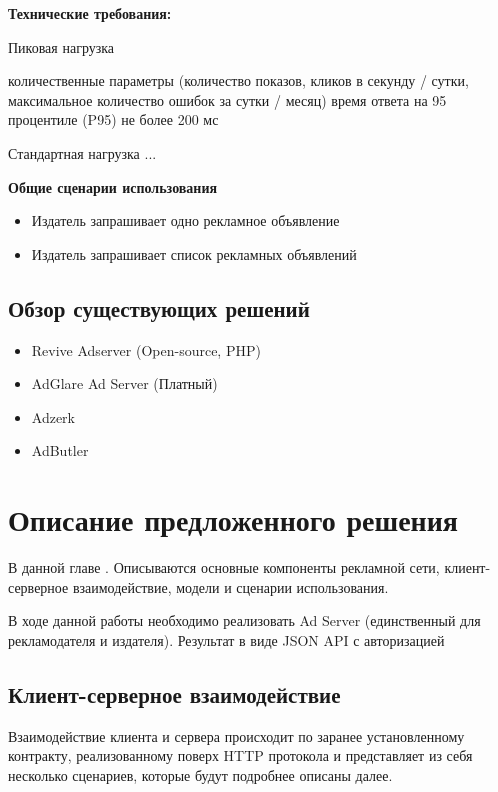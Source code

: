 \documentclass[times]{itmo-student-thesis}
\begin{document}
\textbf{Технические требования:} 

Пиковая нагрузка

количественные параметры (количество показов, кликов в секунду / сутки, максимальное количество ошибок за сутки / месяц)
время ответа на 95 процентиле (P95) не более 200 мс

Стандартная нагрузка ...

\textbf{Общие сценарии использования}
\begin{itemize}
	\item Издатель запрашивает одно рекламное объявление
	\item Издатель запрашивает список рекламных объявлений
\end{itemize}

\section{Обзор существующих решений}

\begin{itemize}
\item Revive Adserver (Open-source, PHP)
\item AdGlare Ad Server (Платный)
\item Adzerk
\item AdButler
\end{itemize}


\finishrelatedwork %


\chapterconclusion







\chapter{Описание предложенного решения}\label{chapter:2}

В данной главе . Описываются основные компоненты рекламной сети, клиент-серверное взаимодействие, модели и сценарии использования.

В ходе данной работы необходимо реализовать Ad Server (единственный для рекламодателя и издателя). Результат в виде JSON API с авторизацией

\section{Клиент-серверное взаимодействие}

Взаимодействие клиента и сервера происходит по заранее установленному контракту, реализованному поверх HTTP протокола и представляет из себя несколько сценариев, которые будут подробнее описаны далее.
\end{document}
